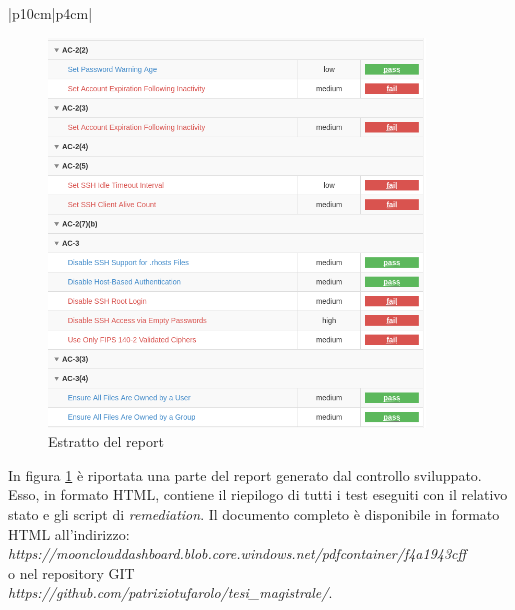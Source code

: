 \documentclass[../main.tex]{subfiles}
\begin{document}
\begin{ltabulary}{|p{10cm}|p{4cm}|}
\end{ltabulary}
\begin{figure}[H]
    \centering
    \includegraphics[width=10cm]{immagini/test_oscap_1_1.png}
    \caption{Estratto del report}\label{ref:report_oscap_1_1}
\end{figure}
    
In figura \ref{ref:report_oscap_1_1} è riportata una parte del report generato dal controllo sviluppato. Esso, in formato HTML, contiene il riepilogo di tutti i test eseguiti con il relativo stato e gli script di \textit{remediation}. Il documento completo è disponibile in formato HTML all'indirizzo:\\
\textit{https://moonclouddashboard.blob.core.windows.net/pdfcontainer/f4a1943cff}
\\
o nel repository GIT\\
\textit{https://github.com/patriziotufarolo/tesi\_magistrale/}.
\end{document}
